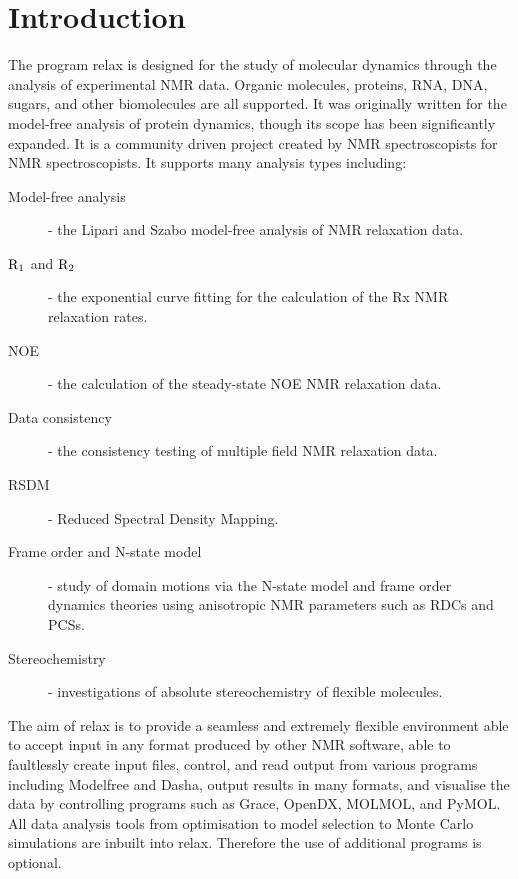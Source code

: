
\chapter{Introduction}

The program relax is designed for the study of molecular dynamics through the analysis of experimental NMR data. Organic molecules, proteins, RNA, DNA, sugars, and other biomolecules are all supported. It was originally written for the model-free analysis of protein dynamics, though its scope has been significantly expanded.  It is a community driven project created by NMR spectroscopists for NMR spectroscopists.  It supports many analysis types including:

\begin{description}
\item[Model-free analysis] - the Lipari and Szabo model-free analysis of NMR relaxation data.
\item[$\mathrm{R}_1$ and $\mathrm{R}_2$] - the exponential curve fitting for the calculation of the Rx NMR relaxation rates.
\item[NOE] - the calculation of the steady-state NOE NMR relaxation data.
\item[Data consistency] - the consistency testing of multiple field NMR relaxation data.
\item[RSDM] - Reduced Spectral Density Mapping.
\item[Frame order and N-state model] - study of domain motions via the N-state model and frame order dynamics theories using anisotropic NMR parameters such as RDCs and PCSs.
\item[Stereochemistry] - investigations of absolute stereochemistry of flexible molecules.
\end{description}

The aim of relax is to provide a seamless and extremely flexible environment able to accept input in any format produced by other NMR software, able to faultlessly create input files, control, and read output from various programs including Modelfree and Dasha, output results in many formats, and visualise the data by controlling programs such as Grace, OpenDX, MOLMOL, and PyMOL.  All data analysis tools from optimisation to model selection to Monte Carlo simulations are inbuilt into relax. Therefore the use of additional programs is optional.

